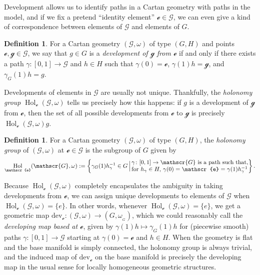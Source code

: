 \documentclass[pdftex]{sigma}
\numberwithin{equation}{section}
\theoremstyle{definition}
\newtheorem{Definition}[Theorem]{Definition}
\DeclareMathOperator{\Hol}{\mathrm{Hol}}
\newcommand{\MC}[1]{\omega_{{}_{#1}}}
\begin{document}
Development allows us to identify paths in a Cartan geometry with paths in the model, and if we fix a pretend ``identity element'' $\mathscr{e}\in\mathscr{G}$, we can even give a kind of correspondence between elements of $\mathscr{G}$ and elements of $G$.

\begin{Definition}For a Cartan geometry $(\mathscr{G},\omega)$ of type $(G,H)$ and points $\mathscr{e},\mathscr{g}\in\mathscr{G}$, we say that $g\in G$ is a \emph{development of $\mathscr{g}$ from $\mathscr{e}$} if and only if there exists a path $\gamma\colon [0,1]\to\mathscr{G}$ and $h\in H$ such that $\gamma(0)=\mathscr{e}$, $\gamma(1)h=\mathscr{g}$, and $\gamma_G(1)h=g$.\end{Definition}

Developments of elements in $\mathscr{G}$ are usually not unique. Thankfully, the \emph{holonomy group} $\Hol_\mathscr{e}(\mathscr{G},\omega)$ tells us precisely how this happens: if $g$ is a development of $\mathscr{g}$ from $\mathscr{e}$, then the set of all possible developments from $\mathscr{e}$ to $\mathscr{g}$ is precisely $\Hol_\mathscr{e}(\mathscr{G},\omega)g$.

\begin{Definition}For a Cartan geometry $(\mathscr{G},\omega)$ of type $(G,H)$, the \emph{holonomy group} of $(\mathscr{G},\omega)$ at $\mathscr{e}\in\mathscr{G}$ is the subgroup of $G$ given by \[\Hol_\mathscr{e}(\mathscr{G},\omega):=\left\{\gamma_G(1)h_\gamma^{-1}\in G \,\Big|\, \begin{array}{@{}l@{}}\gamma\colon [0,1]\to\mathscr{G}\text{ is a path such that,} \\ \text{for }h_\gamma\in H,\,\gamma(0)=\mathscr{e}=\gamma(1)h_\gamma^{-1}\end{array}\right\}.\]
\end{Definition}

Because $\Hol_\mathscr{e}(\mathscr{G},\omega)$ completely encapsulates the ambiguity in taking developments from $\mathscr{e}$, we can assign unique developments to elements of $\mathscr{G}$ when $\Hol_\mathscr{e}(\mathscr{G},\omega)=\{e\}$. In other words, whenever $\Hol_\mathscr{e}(\mathscr{G},\omega)=\{e\}$, we get a geometric map $\mathrm{dev}_\mathscr{e}\colon (\mathscr{G},\omega)\to (G,\MC{G})$, which we could reasonably call the \emph{developing map based at $\mathscr{e}$}, given by $\gamma(1)h\mapsto\gamma_G(1)h$ for (piecewise smooth) paths $\gamma \colon [0,1]\to\mathscr{G}$ starting at $\gamma(0)=\mathscr{e}$ and $h\in H$. When the geometry is flat and the base manifold is simply connected, the holonomy group is always trivial, and the induced map of $\mathrm{dev}_\mathscr{e}$ on the base manifold is precisely the developing map in the usual sense for locally homogeneous geometric structures.
\end{document}
